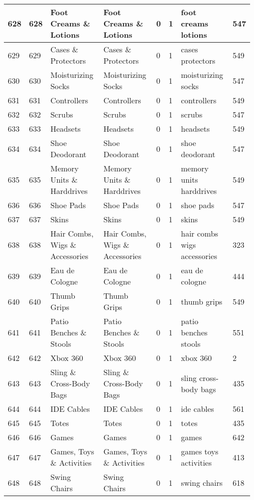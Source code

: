 \begin{longtable}{|l|l|l|l|l|l|l|l|}
628 & 628 & Foot Creams \& Lotions & Foot Creams \& Lotions & 0 & 1 & foot creams lotions & 547 \\ \hline 
629 & 629 & Cases \& Protectors & Cases \& Protectors & 0 & 1 & cases protectors & 549 \\ \hline 
630 & 630 & Moisturizing Socks & Moisturizing Socks & 0 & 1 & moisturizing socks & 547 \\ \hline 
631 & 631 & Controllers & Controllers & 0 & 1 & controllers & 549 \\ \hline 
632 & 632 & Scrubs & Scrubs & 0 & 1 & scrubs & 547 \\ \hline 
633 & 633 & Headsets & Headsets & 0 & 1 & headsets & 549 \\ \hline 
634 & 634 & Shoe Deodorant & Shoe Deodorant & 0 & 1 & shoe deodorant & 547 \\ \hline 
635 & 635 & Memory Units \& Harddrives & Memory Units \& Harddrives & 0 & 1 & memory units harddrives & 549 \\ \hline 
636 & 636 & Shoe Pads & Shoe Pads & 0 & 1 & shoe pads & 547 \\ \hline 
637 & 637 & Skins & Skins & 0 & 1 & skins & 549 \\ \hline 
638 & 638 & Hair Combs, Wigs \& Accessories & Hair Combs, Wigs \& Accessories & 0 & 1 & hair combs wigs accessories & 323 \\ \hline 
639 & 639 & Eau de Cologne & Eau de Cologne & 0 & 1 & eau de cologne & 444 \\ \hline 
640 & 640 & Thumb Grips & Thumb Grips & 0 & 1 & thumb grips & 549 \\ \hline 
641 & 641 & Patio Benches \& Stools & Patio Benches \& Stools & 0 & 1 & patio benches stools & 551 \\ \hline 
642 & 642 & Xbox 360 & Xbox 360 & 0 & 1 & xbox 360 & 2 \\ \hline 
643 & 643 & Sling \& Cross-Body Bags & Sling \& Cross-Body Bags & 0 & 1 & sling cross-body bags & 435 \\ \hline 
644 & 644 & IDE Cables & IDE Cables & 0 & 1 & ide cables & 561 \\ \hline 
645 & 645 & Totes & Totes & 0 & 1 & totes & 435 \\ \hline 
646 & 646 & Games & Games & 0 & 1 & games & 642 \\ \hline 
647 & 647 & Games, Toys \& Activities & Games, Toys \& Activities & 0 & 1 & games toys activities & 413 \\ \hline 
648 & 648 & Swing Chairs & Swing Chairs & 0 & 1 & swing chairs & 618 \\ \hline 

\end{longtable}

